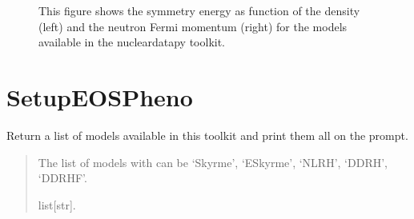 \documentclass[letterpaper,10pt,english]{sphinxmanual}
\begin{document}
\begin{figure}[htbp]
\centering
\capstart

\noindent{}
\caption{This figure shows the symmetry energy as function of the density (left) and the neutron Fermi momentum (right) for the models available in the nucleardatapy toolkit.}\label{\detokenize{source/api/setup_eos_micro_esym:id1}}\end{figure}

\sphinxstepscope


\section{SetupEOSPheno}
\label{\detokenize{source/api/setup_eos_pheno:setupeospheno}}\label{\detokenize{source/api/setup_eos_pheno::doc}}\label{\detokenize{source/api/setup_eos_pheno:module-nucleardatapy.eos.setup_pheno}}

\begin{fulllineitems}
\label{\detokenize{source/api/setup_eos_pheno:nucleardatapy.eos.setup_pheno.pheno_models}}
\pysigstartsignatures
{}
\pysigstopsignatures
\sphinxAtStartPar
Return a list of models available in this toolkit and print them all on the prompt.
\begin{quote}\begin{description}
\sphinxAtStartPar
The list of models with can be ‘Skyrme’, ‘ESkyrme’, ‘NLRH’, ‘DDRH’, ‘DDRHF’.

\sphinxAtStartPar
list{[}str{]}.

\end{description}\end{quote}

\end{fulllineitems}

\end{document}
